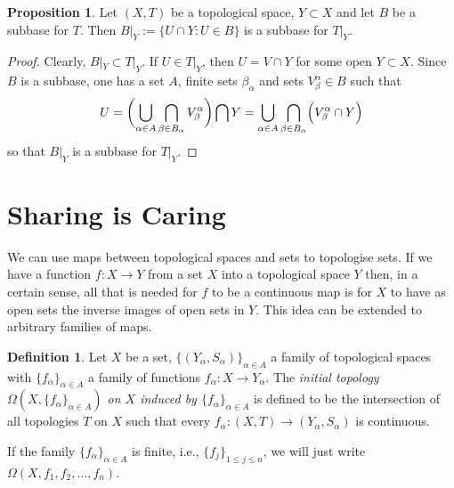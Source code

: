 \documentclass{book}
\theoremstyle{definition}
\newtheorem{proposition}{Proposition}[section]
\newtheorem{definition}{Definition}[section]
\theoremstyle{remark}
\newcommand{\initial}[2]{\Omega(#1, #2)}
\begin{document}
\begin{proposition}
    Let $(X, T)$ be a topological space, $Y\subset X$ and let $B$ be a subbase for $T$. Then $B|_Y:=\{U\cap Y : U\in B\}$ is a subbase for $T|_{Y}$.
\end{proposition}
\begin{proof}
    Clearly, $B|_Y\subset T|_Y$. If $U\in T|_Y$, then $U=V\cap Y$ for some open $Y\subset X$. Since $B$ is a subbase, one has a set $A$, finite sets $\beta_\alpha$ and sets $V^\alpha_\beta\in B$ such that
        $$U=\biggl(\bigcup_{\alpha\in A}\bigcap_{\beta\in B_{\alpha}} V_{\beta}^\alpha\biggr)\bigcap Y=\bigcup_{\alpha\in A}\bigcap_{\beta\in B_{\alpha}} \Bigl(V_{\beta}^\alpha \cap Y\Bigr)$$
    so that $B|_Y$ is a subbase for $T|_Y$.
\end{proof}

\section{Sharing is Caring}
We can use maps between topological spaces and sets to topologise sets. If we have a function $f:X\to Y$ from a set $X$ into a topological space $Y$ then, in a certain sense, all that is needed for $f$ to be a continuous map is for $X$ to have as open sets the inverse images of open sets in $Y$. This idea can be extended to arbitrary families of maps.

\begin{definition}
\label{initialdef}
Let $X$ be a set, $\{(Y_\alpha, S_\alpha)\}_{\alpha\in A}$ a family of topological spaces with $\{f_\alpha\}_{\alpha\in A}$ a family of functions $f_\alpha:X\to Y_\alpha$. The \textit{initial topology $\initial{X}{\{f_\alpha\}_{\alpha\in A}}$ on $X$ induced by $\{f_\alpha\}_{\alpha\in A}$} is defined to be the intersection of all topologies $T$ on $X$ such that every $f_\alpha:(X, T)\to (Y_\alpha, S_\alpha)$ is continuous.
\end{definition}

If the family $\{f_\alpha\}_{\alpha\in A}$ is finite, i.e., $\{f_j\}_{1\leq j\leq n}$, we will just write $\initial{X}{f_1, f_2, \hdots, f_n}$.
\end{document}
